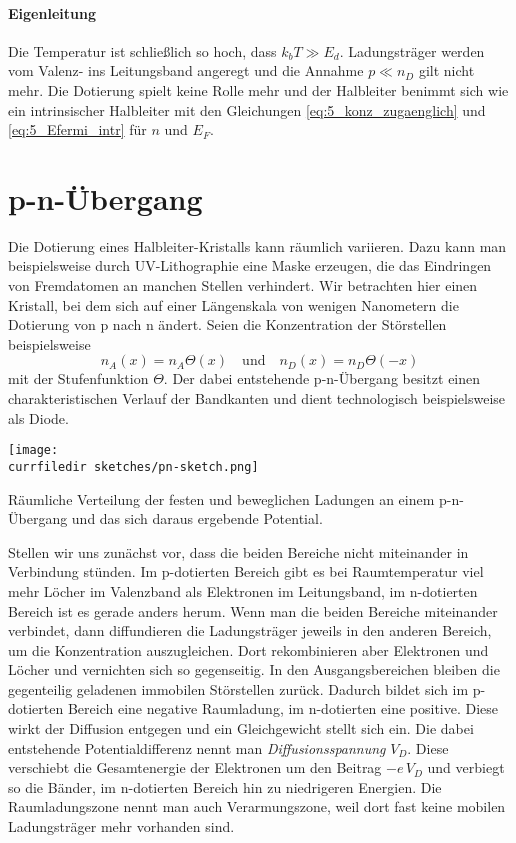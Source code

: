 \paragraph*{Eigenleitung} Die Temperatur ist schließlich so hoch, dass $k_b T \gg E_d$. Ladungsträger werden vom Valenz- ins Leitungsband angeregt und die Annahme $p \ll n_D$ gilt nicht mehr. Die Dotierung spielt keine Rolle mehr und der Halbleiter benimmt sich wie ein intrinsischer Halbleiter mit den Gleichungen  \ref{eq:5_konz_zugaenglich} und  \ref{eq:5_Efermi_intr} für $n$ und $E_F$.


\section{p-n-Übergang}

Die Dotierung eines Halbleiter-Kristalls kann räumlich variieren. Dazu kann man beispielsweise durch UV-Lithographie eine Maske erzeugen, die das Eindringen von Fremdatomen an manchen Stellen verhindert. Wir betrachten hier einen Kristall, bei dem sich auf einer Längenskala von wenigen Nanometern die Dotierung von p nach n ändert.  Seien die Konzentration der Störstellen beispielsweise
\begin{equation}
    n_A(x) = n_A \Theta(x) \quad \text{und}  \quad  n_D(x) = n_D \Theta(-x) 
\end{equation}
mit der Stufenfunktion $\Theta$. Der dabei entstehende p-n-Übergang besitzt einen charakteristischen Verlauf der Bandkanten und dient technologisch beispielsweise als Diode.


\begin{marginfigure}
    \texttt{[image: \\currfiledir sketches/pn-sketch.png]}
    \caption{Räumliche Verteilung der festen und beweglichen Ladungen an einem p-n-Übergang und das sich daraus ergebende Potential.}
\end{marginfigure}

Stellen wir uns zunächst vor, dass die beiden Bereiche nicht miteinander in Verbindung stünden. Im p-dotierten Bereich gibt es bei Raumtemperatur viel mehr  Löcher im Valenzband  als Elektronen im Leitungsband, im n-dotierten Bereich ist es gerade anders herum. Wenn man die beiden Bereiche miteinander verbindet, dann diffundieren die Ladungsträger jeweils in den anderen Bereich, um die Konzentration auszugleichen. Dort rekombinieren aber Elektronen und Löcher und vernichten sich so gegenseitig. In den Ausgangsbereichen bleiben die gegenteilig geladenen immobilen Störstellen zurück. Dadurch bildet sich im p-dotierten Bereich eine negative Raumladung, im n-dotierten eine positive. Diese wirkt der Diffusion entgegen und ein Gleichgewicht stellt sich ein. Die dabei entstehende Potentialdifferenz nennt man \emph{Diffusionsspannung} $V_D$. Diese verschiebt die Gesamtenergie der Elektronen um den Beitrag  $-e \, V_D$ und verbiegt so die Bänder, im n-dotierten Bereich hin zu niedrigeren Energien. Die Raumladungszone nennt man auch Verarmungszone, weil dort fast keine mobilen Ladungsträger mehr vorhanden sind. 


